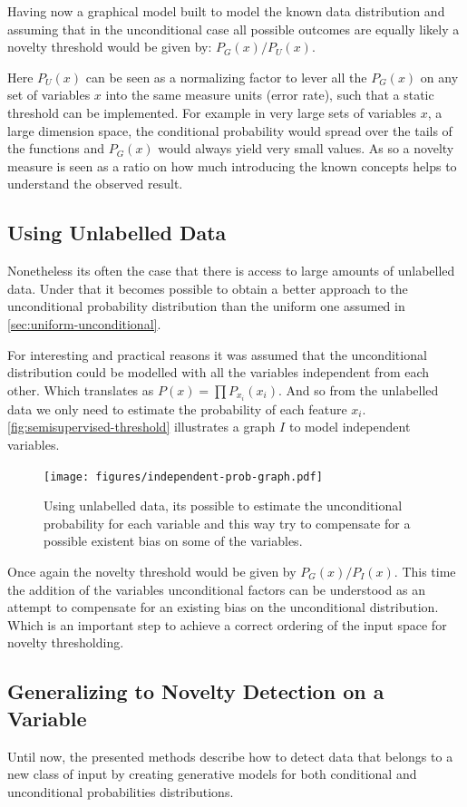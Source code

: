 \documentclass[runningheads,a4paper]{llncs}
\begin{document}
Having now a graphical model built to model the known data distribution and assuming that in the unconditional case all
possible outcomes are equally likely a novelty threshold would be given by: $P_G(x)/P_U(x)$.

Here $P_{U}(x)$ can be seen as a normalizing factor to lever all the $P_G(x)$ on any set of
variables $x$ into the same measure units (error rate), such that a static threshold can be implemented.
For example in very large sets of variables $x$, a large dimension space, the conditional
probability would spread over the tails of the functions and $P_G(x)$ would always yield very
small values.
As so a novelty measure is seen as a ratio on how much introducing the known concepts helps to
understand the observed result.


\subsection{Using Unlabelled Data}
Nonetheless its often the case that there is access to large amounts of unlabelled data.
Under that it becomes possible to obtain a better approach to the unconditional probability
distribution than the uniform one assumed in \autoref{sec:uniform-unconditional}.

For interesting and practical reasons it was assumed that the unconditional distribution
could be modelled with all the variables independent from each other.
Which translates as $P(x)=\prod{P_{x_i}(x_i)}$.
And so from the unlabelled data we only need to estimate the probability of each feature $x_i$.
\autoref{fig:semisupervised-threshold} illustrates a graph $I$ to model independent variables.

\begin{figure}[h]
\centering
\texttt{[image: figures/independent-prob-graph.pdf]}
\caption{\label{fig:semisupervised-threshold}Using unlabelled data, its possible to estimate
         the unconditional probability for each variable and this way try to compensate
         for a possible existent bias on some of the variables.}
\end{figure}

Once again the novelty threshold would be given by $P_G(x)/P_I(x)$.
This time the addition of the variables unconditional factors can be understood as an attempt to compensate
for an existing bias on the unconditional distribution.
Which is an important step to achieve a correct ordering of the input space for novelty thresholding.

\subsection{Generalizing to Novelty Detection on a Variable}
Until now, the presented methods describe how to detect data that belongs to a new class of input
by creating generative models for both conditional and unconditional probabilities distributions.
\end{document}
